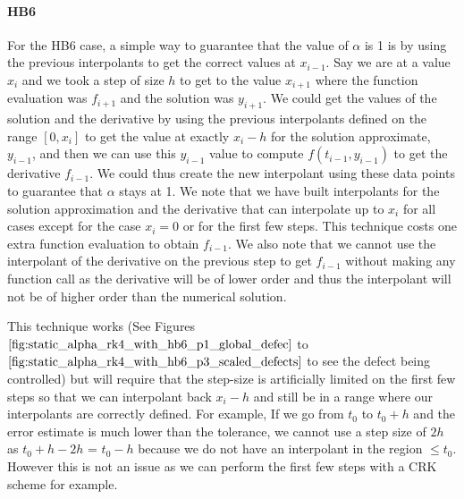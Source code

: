 \documentclass{article}
\begin{document}
\paragraph{HB6} For the HB6 case, a simple way to guarantee that the value of $\alpha$ is 1 is by using the previous interpolants to get the correct values at $x_{i - 1}$. Say we are at a value $x_i$ and we took a step of size $h$ to get to the value $x_{i + 1}$ where the function evaluation was $f_{i + 1}$ and the solution was $y_{i + 1}$. We could get the values of the solution and the derivative by using the previous interpolants defined on the range $[0, x_i]$ to get the value at exactly $x_i - h$ for the solution approximate, $y_{i - 1}$, and then we can use this $y_{i-1}$ value to compute $f(t_{i-1}, y_{i-1})$ to get the derivative $f_{i - 1}$.  We could thus create the new interpolant using these data points to guarantee that $\alpha$ stays at 1. We note that we have built interpolants for the solution approximation and the derivative that  can interpolate up to $x_i$ for all cases except for the case $x_i = 0$ or for the first few steps. This technique costs one extra function evaluation to obtain $f_{i-1}$. We also note that we cannot use the interpolant of the derivative on the previous step to get $f_{i - 1}$ without making any function call as the derivative will be of lower order and thus the interpolant will not be of higher order than the numerical solution.

This technique works (See Figures $\ref{fig:static_alpha_rk4_with_hb6_p1_global_defec}$ to $\ref{fig:static_alpha_rk4_with_hb6_p3_scaled_defects}$ to see the defect being controlled) but will require that the step-size is artificially limited on the first few steps so that we can interpolant back $x_i - h$ and still be in a range where our interpolants are correctly defined. For example, If we go from $t_0$ to $t_0 + h$ and the error estimate is much lower than the tolerance, we cannot use a step size of $2h$ as $t_0 + h - 2h$ = $t_0-h$ because we do not have an interpolant in the region $\leq t_0$. However this is not an issue as we can perform the first few steps with a CRK scheme for example.
\end{document}
